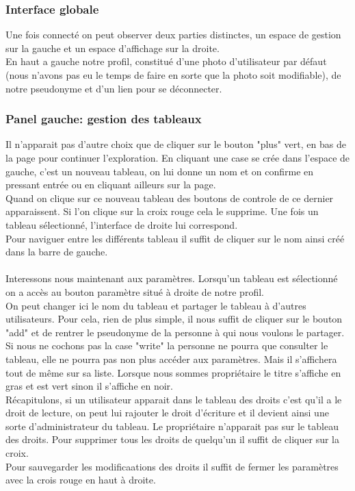 \documentclass[a4paper, 11pt]{article}
\begin{document}
\subsubsection{Interface globale}
Une fois connecté on peut observer deux parties distinctes, un espace de gestion sur la gauche et un 
espace d'affichage sur la droite.
\\
En haut a gauche notre profil, constitué d'une photo d'utilisateur par défaut (nous n'avons pas eu le 
temps de faire en sorte que la photo soit modifiable), de notre pseudonyme et d'un lien pour se déconnecter.

\subsubsection{Panel gauche: gestion des tableaux}
Il n'apparait pas d'autre choix que de cliquer sur le bouton "plus" vert, en bas de la page pour continuer 
l'exploration. En cliquant une case se crée dans l'espace de gauche, c'est un nouveau tableau, on 
lui donne un nom et on confirme en pressant entrée ou en cliquant ailleurs sur la page.
\\
Quand on clique sur ce nouveau tableau des boutons de controle de ce dernier apparaissent. Si l'on clique sur la croix rouge 
cela le supprime. Une fois un tableau sélectionné, l'interface de droite lui correspond.
\\
Pour naviguer entre les différents tableau il suffit de cliquer sur le nom ainsi créé dans la barre de gauche.
\\
\\
Interessons nous maintenant aux paramètres. Lorsqu'un tableau est sélectionné on a accès au bouton paramètre 
situé à droite de notre profil.
\\
On peut changer ici le nom du tableau et partager le tableau à d'autres utilisateurs. Pour cela, 
rien de plus simple, il nous suffit de cliquer sur le bouton "add" et de rentrer le pseudonyme de la personne 
à qui nous voulons le partager. 
\\
Si nous ne cochons pas la case "write" la personne ne pourra que consulter le tableau, elle ne pourra pas non 
plus accéder aux paramètres. Mais il s'affichera tout de même sur sa liste.
Lorsque nous sommes propriétaire le titre s'affiche en gras et est vert sinon il s'affiche en noir.
\\
Récapitulons, si un utilisateur apparait dans le tableau des droits c'est qu'il a le droit de lecture, on peut 
lui rajouter le droit d'écriture et il devient ainsi une sorte d'administrateur du tableau. Le propriétaire 
n'apparait pas sur le tableau des droits. Pour supprimer tous les droits de quelqu'un il suffit de cliquer sur 
la croix.
\\
Pour sauvegarder les modificaations des droits il suffit de fermer les paramètres avec la crois rouge en haut à droite.
\end{document}
